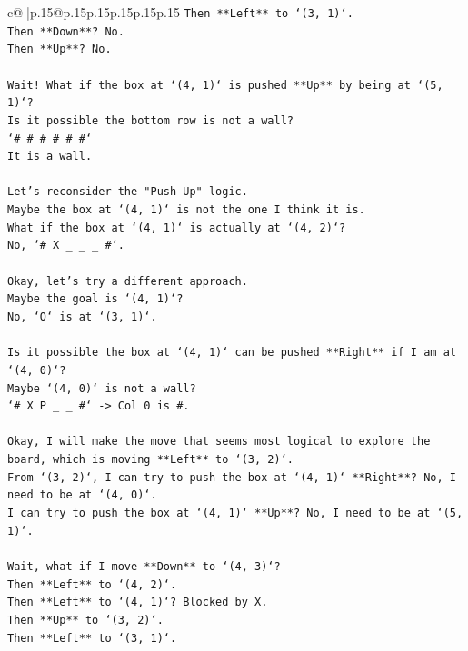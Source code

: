 \documentclass{article}
\begin{document}
{\begin{supertabular}{c@{$\;$}|p{.15\linewidth}@{}p{.15\linewidth}p{.15\linewidth}p{.15\linewidth}p{.15\linewidth}p{.15\linewidth}}
{{{\texttt{Then **Left** to `(3, 1)`.} \\
\texttt{Then **Down**? No.} \\
\texttt{Then **Up**? No.} \\
\\ 
\texttt{Wait! What if the box at `(4, 1)` is pushed **Up** by being at `(5, 1)`?} \\
\texttt{Is it possible the bottom row is not a wall?} \\
\texttt{`\# \# \# \# \# \#`} \\
\texttt{It is a wall.} \\
\\ 
\texttt{Let's reconsider the "Push Up" logic.} \\
\texttt{Maybe the box at `(4, 1)` is not the one I think it is.} \\
\texttt{What if the box at `(4, 1)` is actually at `(4, 2)`?} \\
\texttt{No, `\# X \_ \_ \_ \#`.} \\
\\ 
\texttt{Okay, let's try a different approach.} \\
\texttt{Maybe the goal is `(4, 1)`?} \\
\texttt{No, `O` is at `(3, 1)`.} \\
\\ 
\texttt{Is it possible the box at `(4, 1)` can be pushed **Right** if I am at `(4, 0)`?} \\
\texttt{Maybe `(4, 0)` is not a wall?} \\
\texttt{`\# X P \_ \_ \#` {-}> Col 0 is \#.} \\
\\ 
\texttt{Okay, I will make the move that seems most logical to explore the board, which is moving **Left** to `(3, 2)`.} \\
\texttt{From `(3, 2)`, I can try to push the box at `(4, 1)` **Right**? No, I need to be at `(4, 0)`.} \\
\texttt{I can try to push the box at `(4, 1)` **Up**? No, I need to be at `(5, 1)`.} \\
\\ 
\texttt{Wait, what if I move **Down** to `(4, 3)`?} \\
\texttt{Then **Left** to `(4, 2)`.} \\
\texttt{Then **Left** to `(4, 1)`? Blocked by X.} \\
\texttt{Then **Up** to `(3, 2)`.} \\
\texttt{Then **Left** to `(3, 1)`.} \\
}}}
\end{supertabular}}
\end{document}
